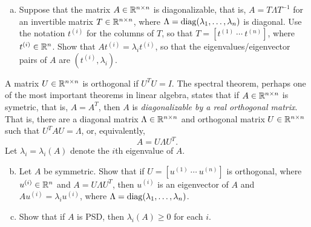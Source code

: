   \begin{enumerate}[(a)]
  \item
    \label{item:diagonalizable-A}
    Suppose that the matrix $A \in \mathbb{R}^{n \times n}$ is diagonalizable,
    that is, $A = T \Lambda T^{-1}$ for an invertible matrix $T \in \mathbb{R}^{n
      \times n}$, where $\Lambda = \mathop{\rm diag}(\lambda_1, \ldots, \lambda_n)$ is
    diagonal. Use the notation $t^{(i)}$ for the columns
    of $T$, so that $T = [t^{(1)} ~ \cdots ~ t^{(n)}]$, where $t^{(i)} \in \mathbb{R}^n$. Show
    that $A t^{(i)} = \lambda_i t^{(i)}$, so that
    the eigenvalues/eigenvector pairs of $A$ are $(t^{(i)}, \lambda_i)$.

  \end{enumerate}

  A matrix $U \in \mathbb{R}^{n \times n}$ is orthogonal if $U^T U = I$.
  The spectral theorem, perhaps one of the most important theorems in
  linear algebra, states that if $A \in \mathbb{R}^{n \times n}$ is symetric,
  that is, $A= A^T$,
  then $A$ is \emph{diagonalizable by a real orthogonal matrix}. That is,
  there are a diagonal matrix $\Lambda \in \mathbb{R}^{n \times n}$ and
  orthogonal matrix $U \in \mathbb{R}^{n \times n}$ such that
  $U^T A U = \Lambda$, or, equivalently,
  \begin{equation*}
    A = U \Lambda U^T.
  \end{equation*}
  Let $\lambda_i = \lambda_i(A)$ denote the $i$th eigenvalue of $A$.
  \begin{enumerate}[(a)]
    \setcounter{enumii}{1}
  \item Let $A$ be symmetric. Show that if $U = [u^{(1)} ~ \cdots ~ u^{(n)}]$
    is orthogonal,
    where $u^{(i)} \in \mathbb{R}^n$ and $A = U \Lambda U^T$, then
    $u^{(i)}$ is an eigenvector of $A$ and
    $A u^{(i)} = \lambda_i u^{(i)}$, where
    $\Lambda = \mathop{\rm diag}(\lambda_1, \ldots, \lambda_n)$.

  \item Show that if $A$ is PSD, then $\lambda_i(A) \ge 0$ for each $i$.

  \end{enumerate}
  
